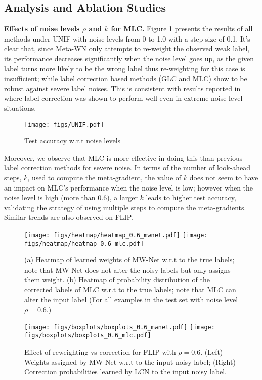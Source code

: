 \subsection{Analysis and Ablation Studies}

\textbf{Effects of noise levels $\rho$ and $k$ for MLC.} Figure \ref{ref:noise_level_unif} presents the results of all
methods under \textsf{UNIF} with noise levels from 0 to 1.0 with a
step size of 0.1. It's clear that, since Meta-WN only attempts to
re-weight the observed weak label, its performance decreases
significantly when the noise level goes up, as the given label turns
more likely to be the wrong label thus re-weighting for this case is
insufficient; while label correction based methods (GLC and MLC) show
to be robust against severe label noises. This is consistent with results reported in ~\cite{hendrycks2018using} where label correction was shown to perform well even in extreme noise level situations. 
  \begin{figure}[t]\centering
   \texttt{[image: figs/UNIF.pdf]}
  \caption{Test accuracy w.r.t noise levels}
  \label{ref:noise_level_unif}
\end{figure}
Moreover, we observe that MLC is more effective in doing this than previous label correction methods for severe 
noise. In terms of the number of look-ahead steps, $k$, used to compute the meta-gradient, the value of $k$ does not seem to have an impact on MLC's performance when the noise level is low; however when the noise level is high (more than 0.6), a larger $k$ leads to higher test accuracy, validating the strategy of using multiple steps to compute the meta-gradients. Similar trends are also observed on \textsf{FLIP}.

\begin{figure}[t] \centering
  \texttt{[image: figs/heatmap/heatmap\_0.6\_mwnet.pdf]}
  \texttt{[image: figs/heatmap/heatmap\_0.6\_mlc.pdf]}
  \caption{(a) Heatmap of learned weights of MW-Net w.r.t to the true
    labels; note that MW-Net does not alter the noisy labels but only assigns them weight. (b) Heatmap of probability distribution of the corrected
    labels of MLC w.r.t to the true labels; note that MLC can alter the input label (For all examples in the
    test set with noise level $\rho=0.6$.)}
  \label{fig:metanet}
\end{figure}

\begin{figure}[t]
\centering
\texttt{[image: figs/boxplots/boxplots\_0.6\_mwnet.pdf]}
\texttt{[image: figs/boxplots/boxplots\_0.6\_mlc.pdf]}
  \caption{Effect of reweighting vs correction for \textsf{FLIP} with $\rho=0.6$. (Left) Weights assigned by MW-Net w.r.t to the input noisy label; (Right) Correction probabilities learned by LCN to the input noisy label.}
  \label{fig:boxplot}
\end{figure}



